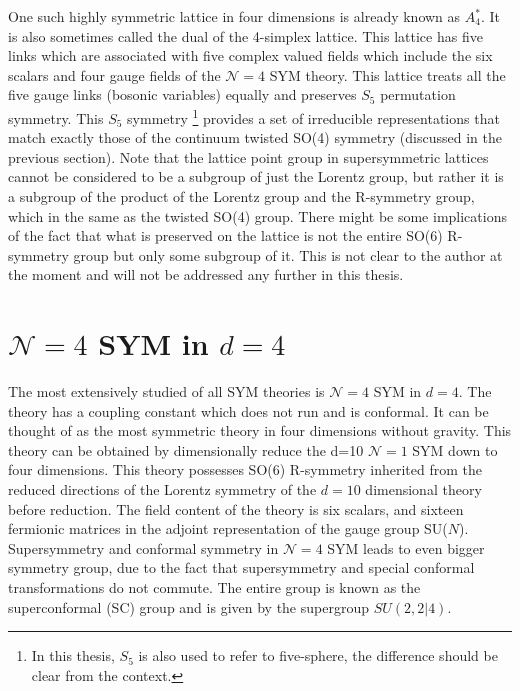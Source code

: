One such highly symmetric lattice in four dimensions is already known as $A_{4}^{*}$. 
It is also sometimes called the dual of the 4-simplex lattice.
This lattice has five links which are associated with five complex valued fields which include the six scalars and four gauge 
fields of the $\mathcal{N}=4$ SYM theory. This lattice treats all the five gauge links (bosonic variables) equally 
and preserves $S_{5}$ permutation symmetry. This $S_{5}$ symmetry \footnote{In this thesis, $S_{5}$
is also used to refer to five-sphere, the difference should be clear from the context.} provides a set of irreducible representations 
that match exactly those of the continuum twisted SO(4) symmetry (discussed in the previous section). Note that the 
lattice point group in supersymmetric lattices cannot be considered to be a subgroup of just the Lorentz group, 
but rather it is a subgroup of the product of the Lorentz group and the R-symmetry group, which in the same as the 
twisted SO(4) group. There might be some implications of the fact that what is preserved on the lattice is not 
the entire SO(6) R-symmetry group but only some subgroup of it. This is not clear to the author at the moment 
and will not be addressed any further in this thesis. 

\section{$\mathcal{N} = 4 $ SYM in $d=4$}

The most extensively studied of all SYM theories is $\mathcal{N} = 4 $ SYM in $d=4$. 
The theory has a coupling constant which does not run and is conformal. 
It can be thought of as the most symmetric theory in four dimensions without gravity. 
This theory can be obtained by dimensionally reduce the d=10 $\mathcal{N} = 1 $ SYM down to 
four dimensions. This theory possesses SO(6) R-symmetry inherited from the reduced directions of the Lorentz symmetry of 
the $d=10$ dimensional theory before reduction. The field content of the theory is six scalars, 
and sixteen fermionic matrices in the adjoint representation of the gauge group SU($N$).  
Supersymmetry and conformal symmetry in $\mathcal{N} = 4 $ SYM leads
to even bigger symmetry group, due to the fact that supersymmetry and
special conformal transformations do not commute. 
The entire group is known as the superconformal (SC) group and is given by
the supergroup $SU(2, 2|4)$. 

